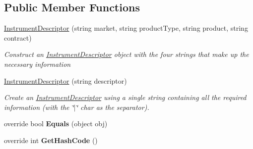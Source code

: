 \subsection*{Public Member Functions}
\begin{DoxyCompactItemize}
\item 
\hyperlink{class_e_z_a_p_i_1_1_containers_1_1_instrument_descriptor_a10af3c66bff7570bc3c172216ed913fd}{Instrument\-Descriptor} (string market, string product\-Type, string product, string contract)
\begin{DoxyCompactList}\small\item\em Construct an \hyperlink{class_e_z_a_p_i_1_1_containers_1_1_instrument_descriptor}{Instrument\-Descriptor} object with the four strings that make up the necessary information \end{DoxyCompactList}\item 
\hyperlink{class_e_z_a_p_i_1_1_containers_1_1_instrument_descriptor_ae08519f913341e6e80ebe202bedcc697}{Instrument\-Descriptor} (string descriptor)
\begin{DoxyCompactList}\small\item\em Create an \hyperlink{class_e_z_a_p_i_1_1_containers_1_1_instrument_descriptor}{Instrument\-Descriptor} using a single string containing all the required information (with the \char`\"{}$|$\char`\"{} char as the separator). \end{DoxyCompactList}\item 
\hypertarget{class_e_z_a_p_i_1_1_containers_1_1_instrument_descriptor_a8f5d27202921fffc6c7f7d8346137882}{override bool {\bfseries Equals} (object obj)}\label{class_e_z_a_p_i_1_1_containers_1_1_instrument_descriptor_a8f5d27202921fffc6c7f7d8346137882}

\item 
\hypertarget{class_e_z_a_p_i_1_1_containers_1_1_instrument_descriptor_afcd1666ac10837c22b51572e9cf4e674}{override int {\bfseries Get\-Hash\-Code} ()}\label{class_e_z_a_p_i_1_1_containers_1_1_instrument_descriptor_afcd1666ac10837c22b51572e9cf4e674}

\end{DoxyCompactItemize}
